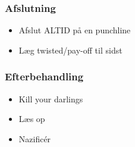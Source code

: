 \documentclass{beamer}
\begin{document}
\begin{frame}
  \frametitle{Afslutning}
    \begin{itemize}
      \pause
      \item Afslut ALTID på en punchline
      \pause
      \item Læg twisted/pay-off til sidst
    \end{itemize}
\end{frame}

\begin{frame}
  \frametitle{Efterbehandling}
    \begin{itemize}
      \pause
      \item Kill your darlings
      \pause
      \item Læs op
      \pause
      \item Nazificér
    \end{itemize}
\end{frame}
\end{document}
